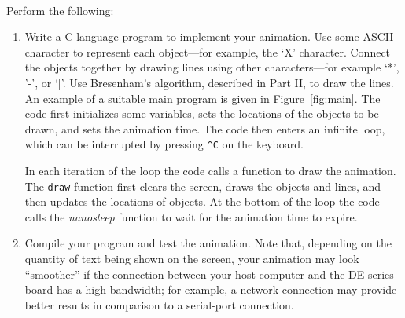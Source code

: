 \documentclass[epsfig,10pt,fullpage]{article}
\begin{document}
~\\
\noindent
Perform the following:

\begin{enumerate}

\item Write a C-language program to implement your animation. Use some ASCII character to 
represent each object---for example, the `X' character. Connect the objects together by
drawing lines using other characters---for example `*', '-', or `|'. Use Bresenham's
algorithm, described in Part II, to draw the lines. An example of a suitable main program is 
given in Figure~\ref{fig:main}. The code first initializes some variables, sets the
locations of the objects to be drawn, and sets the animation time. The code then enters an
infinite loop, which can be interrupted by pressing \texttt{\^{ }C} on the keyboard. 

In each iteration of the loop the code calls a function to draw the animation. The
\texttt{draw} function first clears the screen, draws the objects and lines, and then updates 
the locations of objects. At the bottom of the loop the code calls the {\it nanosleep} function
to wait for the animation time to expire.

\item Compile your program and test the animation. Note that, depending on the quantity of
text being shown on the screen, your animation may look ``smoother'' if the connection between 
your host computer and the DE-series board has a high bandwidth; for example, a network 
connection may provide better results in comparison to a serial-port connection.
\end{enumerate}
\end{document}
